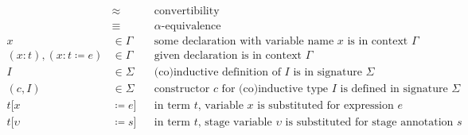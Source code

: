 \begin{align*}
&\approx                               && \text{convertibility} \\
&\equiv                                && \text{$\alpha$-equivalence} \\
x &\in \Gamma                          && \text{some declaration with variable name $x$ is in context $\Gamma$} \\
(x: t), (x: t \coloneqq e) &\in \Gamma && \text{given declaration is in context $\Gamma$} \\
I &\in \Sigma                          && \text{(co)inductive definition of $I$ is in signature $\Sigma$} \\
(c, I) &\in \Sigma                     && \text{constructor $c$ for (co)inductive type $I$ is defined in signature $\Sigma$} \\
t[x &\coloneqq e]                      && \text{in term $t$, variable $x$ is substituted for expression $e$} \\
t[\upsilon &\coloneqq s]               && \text{in term $t$, stage variable $\upsilon$ is substituted for stage annotation $s$}
\end{align*}